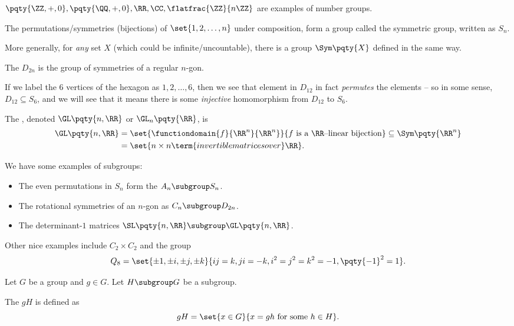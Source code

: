\begin{examples}
    \label{ex:examples-of-groups}%
    \(\pqty{\ZZ, +, 0}, \pqty{\QQ, +, 0}, \RR, \CC, \flatfrac{\ZZ}{n \ZZ}\) are examples of number groups.

    The permutations/symmetries (bijections) of \(\set{1, 2, \ldots, n}\) under composition, form a group called the symmetric group, written as \(S_n\).
    
    More generally, for \emph{any} set \(X\) (which could be infinite/uncountable), there is a group \(\Sym\pqty{X}\) defined in the same way.

    The  \(D_{2n}\) is the group of symmetries of a regular \(n\)-gon.

    If we label the \(6\) vertices of the hexagon as \(1, 2, \ldots, 6\), then we see that element in \(D_{12}\) in fact \emph{permutes} the elements -- so in some sense, \(D_{12} \subseteq S_6\), and we will see that it means there is some \emph{injective} homomorphism from \(D_{12}\) to \(S_6\).

    The , denoted \(\GL\pqty{n, \RR}\) or \(\GL_n\pqty{\RR}\), is
    \begin{align*}
        \GL\pqty{n, \RR} &= \set{\functiondomain{f}{\RR^n}{\RR^n}}{f \text{ is a }\RR\text{--linear bijection}} \subseteq \Sym\pqty{\RR^n} \\
        &= \set{n \times n \term{ invertible matrices over }\RR}.
    \end{align*}

    We have some examples of subgroups:
    \begin{itemize}
        \item The even permutations in \(S_n\) form the  \(A_n \subgroup S_n\).
        \item The rotational symmetries of an \(n\)-gon as \(C_n \subgroup D_{2n}\).
        \item The determinant-\(1\) matrices \(\SL\pqty{n, \RR} \subgroup \GL\pqty{n, \RR}\).
    \end{itemize}

    Other nice examples include \(C_2 \times C_2\) and the group
    \[
        Q_8 = \set{\pm 1, \pm i, \pm j, \pm k}{ij = k, ji = -k, i^2 = j^2 = k^2 = -1, \pqty{-1}^2 = 1}.
    \]
\end{examples}

\begin{definition}[Coset]
    \label{def:coset}%
    Let \(G\) be a group and  \(g \in G\). Let \(H \subgroup G\) be a subgroup.
    
    The  \(gH\) is defined as
    \[
        gH = \set{x \in G}{x = gh \text{ for some } h \in H}.
    \]
\end{definition}

